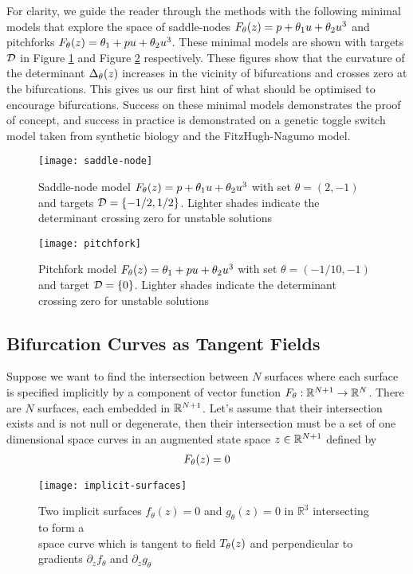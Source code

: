 For clarity, we guide the reader through the methods with the following minimal models that explore the space of saddle-nodes $F_{\theta}(z) = p + \theta_{1}u+\theta_{2}u^3$ and pitchforks $F_{\theta}(z) = \theta_{1} + p u+\theta_{2}u^3$. These minimal models are shown with targets $\mathcal{D}$ in Figure \ref{fig:saddle-node} and Figure \ref{fig:pitchfork} respectively. These figures show that the curvature of the determinant $\Delta_{\theta}(z)$ increases in the vicinity of bifurcations and crosses zero at the bifurcations. This gives us our first hint of what should be optimised to encourage bifurcations. Success on these minimal models demonstrates the proof of concept, and success in practice is demonstrated on a genetic toggle switch model taken from synthetic biology and the FitzHugh-Nagumo model.
\begin{figure}[H]
\centering{}
\captionsetup{justification=centering}
\texttt{[image: saddle-node]}
\caption{Saddle-node model $F_{\theta}(z) = p + \theta_{1}u+\theta_{2}u^3$ with set $\theta=(2,-1)$ and targets $\mathcal{D}=\{-1/2,1/2\}$. Lighter shades indicate the determinant crossing zero for unstable solutions}
\label{fig:saddle-node}
\end{figure}
\begin{figure}[H]
\centering{}
\captionsetup{justification=centering}
\texttt{[image: pitchfork]}
\caption{Pitchfork model $F_{\theta}(z) = \theta_{1} + p u+\theta_{2}u^3$ with set $\theta=(-1/10,-1)$ and target $\mathcal{D}=\{0\}$. Lighter shades indicate the determinant crossing zero for unstable solutions}
\label{fig:pitchfork}
\end{figure}

\subsection{Bifurcation Curves as Tangent Fields}
Suppose we want to find the intersection between $N$ surfaces where each surface is specified implicitly by a component of vector function $F_{\theta}:\mathbb{R}^{N+1}\rightarrow\mathbb{R}^N$. There are $N$ surfaces, each embedded in $\mathbb{R}^{N+1}$. Let's assume that their intersection exists and is not null or degenerate, then their intersection must be a set of one dimensional space curves in an augmented state space $z\in\mathbb{R}^{N+1}$ defined by
\begin{align}
    F_{\theta}(z) = 0
\end{align}
\begin{figure}[H]
\centering{}
\captionsetup{justification=centering}
\texttt{[image: implicit-surfaces]}
\caption{Two implicit surfaces $f_{\theta}(z)=0$ and $g_{\theta}(z)=0$ in $\mathbb{R}^3$ intersecting to form a\\ space curve which is tangent to field $T_{\theta}(z)$ and perpendicular to gradients $\partial_{z}f_{\theta}$ and $\partial_{z}g_{\theta}$}
\label{fig:implicit-surfaces}
\end{figure}

